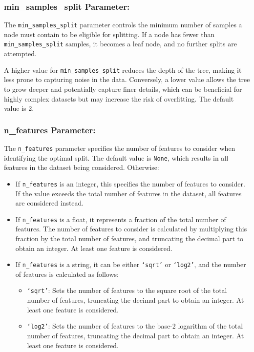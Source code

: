\documentclass{article}
\begin{document}
\subsubsection*{min\_samples\_split Parameter:}

The \texttt{min\_samples\_split} parameter controls the minimum number of samples a node must contain to be eligible for splitting. If a node has fewer than \texttt{min\_samples\_split} samples, it becomes a leaf node, and no further splits are attempted.

A higher value for \texttt{min\_samples\_split} reduces the depth of the tree, making it less prone to capturing noise in the data. Conversely, a lower value allows the tree to grow deeper and potentially capture finer details, which can be beneficial for highly complex datasets but may increase the risk of overfitting. The default value is 2.

\subsubsection*{n\_features Parameter:}

The \texttt{n\_features} parameter specifies the number of features to consider when identifying the optimal split. The default value is \texttt{None}, which results in all features in the dataset being considered. Otherwise:

\begin{itemize}
    \item If \texttt{n\_features} is an integer, this specifies the number of features to consider. If the value exceeds the total number of features in the dataset, all features are considered instead.
    \item If \texttt{n\_features} is a float, it represents a fraction of the total number of features. The number of features to consider is calculated by multiplying this fraction by the total number of features, and truncating the decimal part to obtain an integer. At least one feature is considered.
    \item If \texttt{n\_features} is a string, it can be either \texttt{`sqrt'} or \texttt{`log2'}, and the number of features is calculated as follows:
    \begin{itemize}
        \item \texttt{`sqrt'}: Sets the number of features to the square root of the total number of features, truncating the decimal part to obtain an integer. At least one feature is considered.
        \item \texttt{`log2'}: Sets the number of features to the base-2 logarithm of the total number of features, truncating the decimal part to obtain an integer. At least one feature is considered.
    \end{itemize}
\end{itemize}
\end{document}
